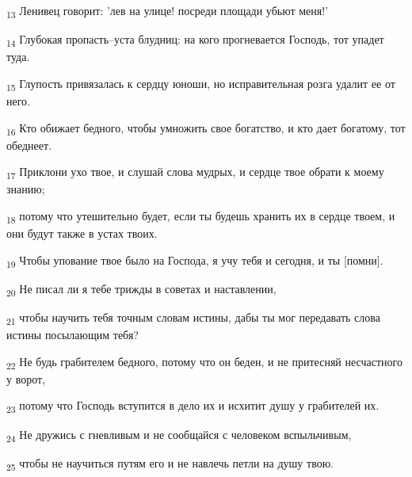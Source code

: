 \begin{tcolorbox}
\textsubscript{13} Ленивец говорит: 'лев на улице! посреди площади убьют меня!'
\end{tcolorbox}
\begin{tcolorbox}
\textsubscript{14} Глубокая пропасть--уста блудниц: на кого прогневается Господь, тот упадет туда.
\end{tcolorbox}
\begin{tcolorbox}
\textsubscript{15} Глупость привязалась к сердцу юноши, но исправительная розга удалит ее от него.
\end{tcolorbox}
\begin{tcolorbox}
\textsubscript{16} Кто обижает бедного, чтобы умножить свое богатство, и кто дает богатому, тот обеднеет.
\end{tcolorbox}
\begin{tcolorbox}
\textsubscript{17} Приклони ухо твое, и слушай слова мудрых, и сердце твое обрати к моему знанию;
\end{tcolorbox}
\begin{tcolorbox}
\textsubscript{18} потому что утешительно будет, если ты будешь хранить их в сердце твоем, и они будут также в устах твоих.
\end{tcolorbox}
\begin{tcolorbox}
\textsubscript{19} Чтобы упование твое было на Господа, я учу тебя и сегодня, и ты [помни].
\end{tcolorbox}
\begin{tcolorbox}
\textsubscript{20} Не писал ли я тебе трижды в советах и наставлении,
\end{tcolorbox}
\begin{tcolorbox}
\textsubscript{21} чтобы научить тебя точным словам истины, дабы ты мог передавать слова истины посылающим тебя?
\end{tcolorbox}
\begin{tcolorbox}
\textsubscript{22} Не будь грабителем бедного, потому что он беден, и не притесняй несчастного у ворот,
\end{tcolorbox}
\begin{tcolorbox}
\textsubscript{23} потому что Господь вступится в дело их и исхитит душу у грабителей их.
\end{tcolorbox}
\begin{tcolorbox}
\textsubscript{24} Не дружись с гневливым и не сообщайся с человеком вспыльчивым,
\end{tcolorbox}
\begin{tcolorbox}
\textsubscript{25} чтобы не научиться путям его и не навлечь петли на душу твою.
\end{tcolorbox}
